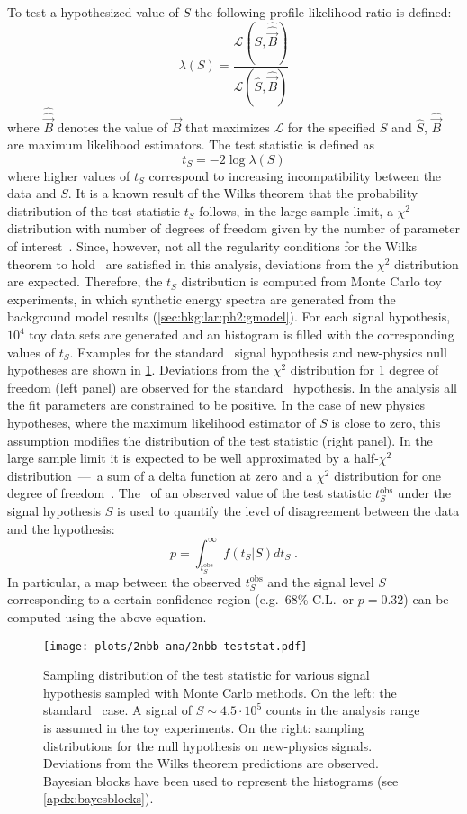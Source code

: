To test a hypothesized value of $S$ the following profile likelihood ratio is defined:
\[
  \lambda(S) = \frac{\mathcal{L}(S, \hat{\hat{\vec{B}}})}{\mathcal{L}(\hat{S}, \hat{\vec{B}})}
\]
where $\hat{\hat{\vec{B}}}$ denotes the value of $\vec{B}$ that maximizes $\mathcal{L}$
for the specified $S$ and $\hat{S}$, $\hat{\vec{B}}$ are maximum likelihood
estimators. The test statistic is defined as
\[
  t_S = -2\log\lambda(S)
\]
where higher values of $t_S$ correspond to increasing incompatibility between the data and
$S$. It is a known result of the Wilks theorem that the probability distribution of the
test statistic $t_S$ follows, in the large sample limit, a $\chi^2$ distribution with
number of degrees of freedom given by the number of parameter of
interest~\cite{Cowan2011}.  Since, however, not all the regularity conditions for the
Wilks theorem to hold~\cite{Algeri2020} are satisfied in this analysis, deviations from
the $\chi^2$ distribution are expected. Therefore, the $t_S$ distribution is computed from
Monte Carlo toy experiments, in which synthetic energy spectra are generated from the
background model results (\cref{sec:bkg:lar:ph2:gmodel}). For each signal hypothesis,
$10^4$ toy data sets are generated and an histogram is filled with the corresponding
values of $t_S$. Examples for the standard \nnbb\ signal hypothesis and new-physics
null hypotheses are shown in \cref{fig:2nbb-ana:ts-dist}. Deviations from the $\chi^2$
distribution for 1 degree of freedom (left panel) are observed for the standard \nnbb\
hypothesis. In the analysis all the fit parameters are constrained to be positive. In the
case of new physics hypotheses, where the maximum likelihood estimator of $S$ is close to
zero, this assumption modifies the distribution of the test statistic (right panel). In
the large sample limit it is expected to be well approximated by a half-$\chi^2$
distribution~---~a sum of a delta function at zero and a $\chi^2$ distribution for one
degree of freedom~\cite{Cowan2011}.
\newpar
The \pvalue\ of an observed value of the test statistic $t_S^\text{obs}$ under the signal
hypothesis $S$ is used to quantify the level of disagreement between the data and the
hypothesis:
\[
  p = \int_{t_S^\text{obs}}^\infty f(t_S | S) dt_S \;.
\]
In particular, a map between the observed $t_S^\text{obs}$ and the signal level $S$
corresponding to a certain confidence region (e.g.~68\% C.L.~or $p=0.32$) can be computed
using the above equation.

\begin{figure}
  \centering
  \texttt{[image: plots/2nbb-ana/2nbb-teststat.pdf]}
  \caption{%
    Sampling distribution of the test statistic for various signal hypothesis sampled with
    Monte Carlo methods. On the left: the standard \nnbb\ case. A signal of $S \sim 4.5
    \cdot 10^5$ counts in the analysis range is assumed in the toy experiments. On the
    right: sampling distributions for the null hypothesis on new-physics signals.
    Deviations from the Wilks theorem predictions are observed. Bayesian blocks have been
    used to represent the histograms (see \cref{apdx:bayesblocks}). \fillme{add LV}
  }\label{fig:2nbb-ana:ts-dist}
\end{figure}

